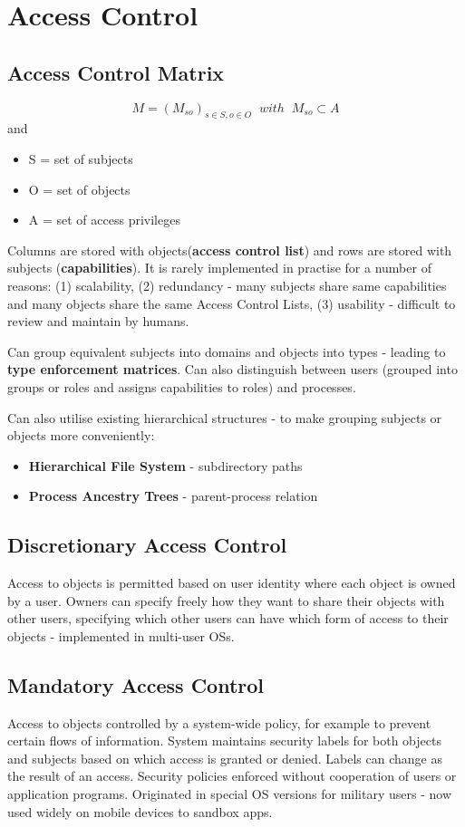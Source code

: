 \documentclass{article}
\begin{document}
\section{Access Control}
\subsection{Access Control Matrix}
$$M = (M_{so})_{s \in S, o \in O} \; \; with \; \; M_{so} \subset A$$
and
\begin{itemize}
	\item S = set of subjects
	\item O = set of objects
	\item A = set of access privileges
\end{itemize}

Columns are stored with objects(\textbf{access control list}) and rows are stored with subjects (\textbf{capabilities}). It is rarely implemented in practise for a number of reasons: (1) scalability, (2) redundancy - many subjects share same capabilities and many objects share the same Access Control Lists, (3) usability - difficult to review and maintain by humans.

Can group equivalent subjects into domains and objects into types - leading to \textbf{type enforcement matrices}. Can also distinguish between users (grouped into groups or roles and assigns capabilities to roles) and processes.

\bigskip
\noindent
Can also utilise existing hierarchical structures - to make grouping subjects or objects more conveniently:
\begin{itemize}
	\item \textbf{Hierarchical File System} - subdirectory paths
	\item \textbf{Process Ancestry Trees} - parent-process relation
\end{itemize}

\subsection{Discretionary Access Control}
Access to objects is permitted based on user identity where each object is owned by a user. Owners can specify freely how they want to share their objects with other users, specifying which other users can have which form of access to their objects - implemented in multi-user OSs.

\subsection{Mandatory Access Control}
Access to objects controlled by a system-wide policy, for example to prevent certain flows of information. System maintains security labels for both objects and subjects based on which access is granted or denied. Labels can change as the result of an access. Security policies enforced without cooperation of users or application programs. Originated in special OS versions for military users - now used widely on mobile devices to sandbox apps. 
\end{document}
